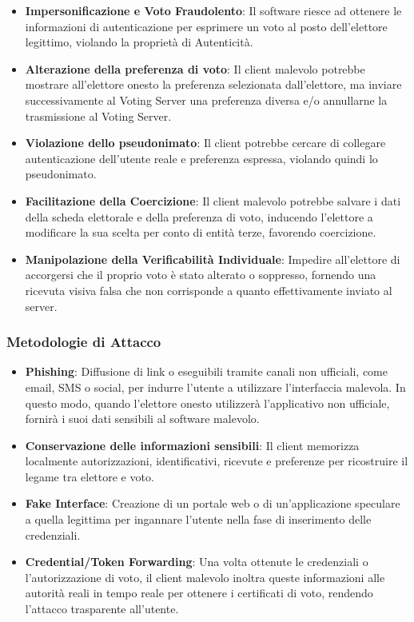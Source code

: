 \documentclass[a4paper,12pt]{article}
\begin{document}
\begin{itemize}
    \item \textbf{Impersonificazione e Voto Fraudolento}: Il software riesce ad ottenere le informazioni di autenticazione per esprimere un voto al posto dell'elettore legittimo, violando la proprietà di Autenticità.

    \item \textbf{Alterazione della preferenza di voto}: Il client malevolo potrebbe mostrare all'elettore onesto la preferenza selezionata dall'elettore, ma inviare successivamente al Voting Server una preferenza diversa e/o annullarne la trasmissione al Voting Server.

    \item \textbf{Violazione dello pseudonimato}: Il client potrebbe cercare di collegare autenticazione dell'utente reale e preferenza espressa, violando quindi lo pseudonimato.

    \item \textbf{Facilitazione della Coercizione}: Il client malevolo potrebbe salvare i dati della scheda elettorale e della preferenza di voto, inducendo l'elettore a modificare la sua scelta per conto di entità terze, favorendo coercizione.

    \item \textbf{Manipolazione della Verificabilità Individuale}: Impedire all'elettore di accorgersi che il proprio voto è stato alterato o soppresso, fornendo una ricevuta visiva falsa che non corrisponde a quanto effettivamente inviato al server.
\end{itemize}

\subsubsection*{Metodologie di Attacco}

\begin{itemize}
    \item \textbf{Phishing}: Diffusione di link o eseguibili tramite canali non ufficiali, come email, SMS o social, per indurre l'utente a utilizzare l'interfaccia malevola. In questo modo, quando l'elettore onesto utilizzerà l'applicativo non ufficiale, fornirà i suoi dati sensibili al software malevolo.

    \item \textbf{Conservazione delle informazioni sensibili}: Il client memorizza localmente autorizzazioni, identificativi, ricevute e preferenze per ricostruire il legame tra elettore e voto.

    \item \textbf{Fake Interface}: Creazione di un portale web o di un'applicazione speculare a quella legittima per ingannare l'utente nella fase di inserimento delle credenziali.

    \item \textbf{Credential/Token Forwarding}: Una volta ottenute le credenziali o l'autorizzazione di voto, il client malevolo inoltra queste informazioni alle autorità reali in tempo reale per ottenere i certificati di voto, rendendo l'attacco trasparente all'utente.
\end{itemize}
\end{document}

